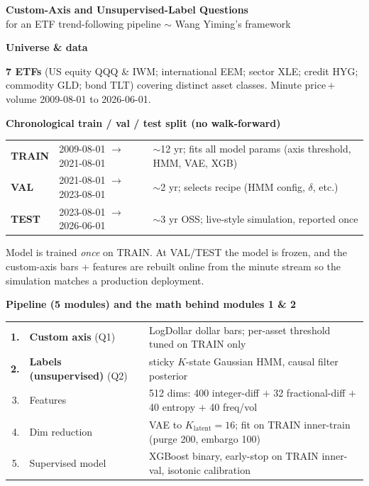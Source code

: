 \documentclass[11pt]{article}
\newcommand{\shead}[1]{\par\vspace{4pt}\noindent\textbf{\normalsize #1}\par\vspace{1pt}}
\begin{document}
\begin{center}
{\Large \textbf{Custom-Axis and Unsupervised-Label Questions}} \\[2pt]
{\small for an ETF trend-following pipeline ${\sim}$ Wang Yiming's framework}
\end{center}

\shead{Universe \& data}

\textbf{7 ETFs} (US equity QQQ \& IWM; international EEM; sector XLE; credit HYG; commodity GLD; bond TLT) covering distinct asset classes. Minute price\,$+$\,volume 2009-08-01 to 2026-06-01.

\shead{Chronological train / val / test split (no walk-forward)}

\smallskip
\begin{tabular}{@{}lll@{}}
\textbf{TRAIN} & 2009-08-01 $\to$ 2021-08-01 & $\sim$12 yr; fits all model params (axis threshold, HMM, VAE, XGB) \\
\textbf{VAL}   & 2021-08-01 $\to$ 2023-08-01 & $\sim$2 yr; selects recipe (HMM config, $\delta$, etc.) \\
\textbf{TEST}  & 2023-08-01 $\to$ 2026-06-01 & $\sim$3 yr OSS; live-style simulation, reported once \\
\end{tabular}

Model is trained \emph{once} on TRAIN. At VAL/TEST the model is frozen, and the custom-axis bars + features are rebuilt online from the minute stream so the simulation matches a production deployment.

\shead{Pipeline (5 modules) and the math behind modules 1 \& 2}

\smallskip
\begin{tabular}{@{}rll@{}}
\textbf{1.} & \textbf{Custom axis} (Q1) & LogDollar dollar bars; per-asset threshold tuned on TRAIN only \\
\textbf{2.} & \textbf{Labels (unsupervised)} (Q2) & sticky $K$-state Gaussian HMM, causal filter posterior \\
3. & Features                  & 512 dims: 400 integer-diff $+$ 32 fractional-diff $+$ 40 entropy $+$ 40 freq/vol \\
4. & Dim reduction             & VAE to $K_{\mathrm{latent}}{=}16$; fit on TRAIN inner-train (purge 200, embargo 100) \\
5. & Supervised model          & XGBoost binary, early-stop on TRAIN inner-val, isotonic calibration \\
\end{tabular}
\end{document}
